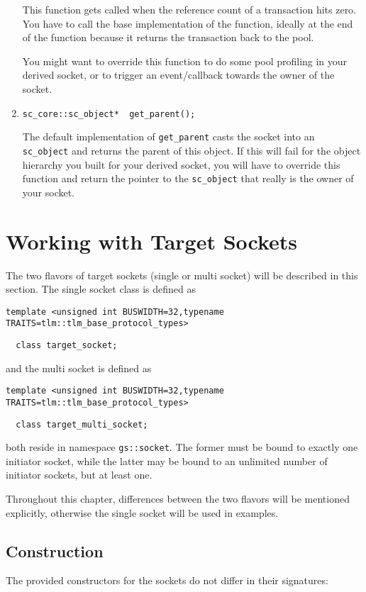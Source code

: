 \documentclass[a4paper,10pt]{article}          %
\begin{document}
\begin{enumerate}
This function gets called when the reference count of a transaction hits zero. You have to call the base implementation of the function, ideally at the end of the function because it returns the transaction back to the pool.

You might want to override this function to do some pool profiling in your derived socket, or to trigger an event/callback towards the owner of the socket.

\item
\verb|sc_core::sc_object*  get_parent();|

The default implementation of \verb|get_parent| casts the socket into an \verb|sc_object| and returns the parent of this object. If this will fail for the object hierarchy you built for your derived socket, you will have to override this function and return the pointer to the \verb|sc_object| that really is the owner of your socket.

\end{enumerate}



\section{Working with Target Sockets}

The two flavors of target sockets (single or multi socket) will be described in this section. The single socket class is defined as 

\verb|template <unsigned int BUSWIDTH=32,typename TRAITS=tlm::tlm_base_protocol_types>|

\verb|  class target_socket;|

\noindent and the multi socket is defined as

\verb|template <unsigned int BUSWIDTH=32,typename TRAITS=tlm::tlm_base_protocol_types>|

\verb|  class target_multi_socket;|

\noindent both reside in namespace \verb|gs::socket|. The former must be bound to exactly one initiator socket, while the latter may be bound to an unlimited number of initiator sockets, but at least one.

Throughout this chapter, differences between the two flavors will be mentioned explicitly, otherwise the single socket will be used in examples.

\subsection{Construction}
The provided constructors for the sockets do not differ in their signatures:
\end{document}

